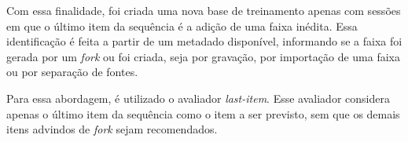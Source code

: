 Com essa finalidade, foi criada uma nova base de treinamento apenas com sessões
em que o último item da sequência é a adição de uma faixa inédita. Essa
identificação é feita a partir de um metadado disponível, informando se a faixa
foi gerada por um \textit{fork} ou foi criada, seja por gravação, por importação
de uma faixa ou por separação de fontes.

Para essa abordagem, é utilizado o avaliador \textit{last-item}. Esse avaliador
considera apenas o último item da sequência como o item a ser previsto, sem que
os demais itens advindos de \textit{fork} sejam recomendados.



